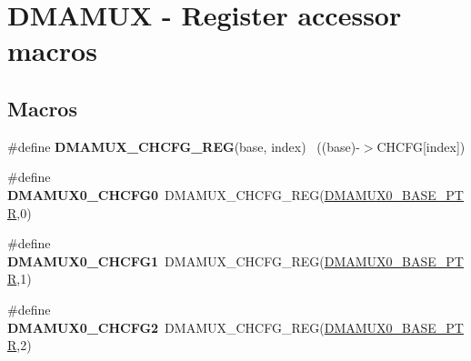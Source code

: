 \hypertarget{group___d_m_a_m_u_x___register___accessor___macros}{}\section{D\+M\+A\+M\+U\+X -\/ Register accessor macros}
\label{group___d_m_a_m_u_x___register___accessor___macros}
\subsection*{Macros}
\begin{DoxyCompactItemize}
\item 
\hypertarget{group___d_m_a_m_u_x___register___accessor___macros_ga10cf09fe06ed04dc004b7b41da7cbf0d}{}\#define {\bfseries D\+M\+A\+M\+U\+X\+\_\+\+C\+H\+C\+F\+G\+\_\+\+R\+E\+G}(base,  index)                      ~((base)-\/$>$C\+H\+C\+F\+G\mbox{[}index\mbox{]})\label{group___d_m_a_m_u_x___register___accessor___macros_ga10cf09fe06ed04dc004b7b41da7cbf0d}

\item 
\hypertarget{group___d_m_a_m_u_x___register___accessor___macros_gafbdd08eec205390f76af0e1e2aa323cf}{}\#define {\bfseries D\+M\+A\+M\+U\+X0\+\_\+\+C\+H\+C\+F\+G0}~D\+M\+A\+M\+U\+X\+\_\+\+C\+H\+C\+F\+G\+\_\+\+R\+E\+G(\hyperlink{group___d_m_a_m_u_x___peripheral_ga403b61d306820e4e1113c636300004a3}{D\+M\+A\+M\+U\+X0\+\_\+\+B\+A\+S\+E\+\_\+\+P\+T\+R},0)\label{group___d_m_a_m_u_x___register___accessor___macros_gafbdd08eec205390f76af0e1e2aa323cf}

\item 
\hypertarget{group___d_m_a_m_u_x___register___accessor___macros_ga8c0edd8cf3e5d5f046ceb4df69c8724b}{}\#define {\bfseries D\+M\+A\+M\+U\+X0\+\_\+\+C\+H\+C\+F\+G1}~D\+M\+A\+M\+U\+X\+\_\+\+C\+H\+C\+F\+G\+\_\+\+R\+E\+G(\hyperlink{group___d_m_a_m_u_x___peripheral_ga403b61d306820e4e1113c636300004a3}{D\+M\+A\+M\+U\+X0\+\_\+\+B\+A\+S\+E\+\_\+\+P\+T\+R},1)\label{group___d_m_a_m_u_x___register___accessor___macros_ga8c0edd8cf3e5d5f046ceb4df69c8724b}

\item 
\hypertarget{group___d_m_a_m_u_x___register___accessor___macros_gaa1b0bee7c4b71acced055cef09768a29}{}\#define {\bfseries D\+M\+A\+M\+U\+X0\+\_\+\+C\+H\+C\+F\+G2}~D\+M\+A\+M\+U\+X\+\_\+\+C\+H\+C\+F\+G\+\_\+\+R\+E\+G(\hyperlink{group___d_m_a_m_u_x___peripheral_ga403b61d306820e4e1113c636300004a3}{D\+M\+A\+M\+U\+X0\+\_\+\+B\+A\+S\+E\+\_\+\+P\+T\+R},2)\label{group___d_m_a_m_u_x___register___accessor___macros_gaa1b0bee7c4b71acced055cef09768a29}


\end{DoxyCompactItemize}

